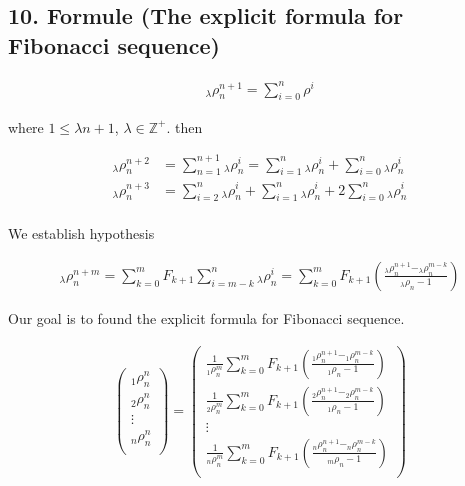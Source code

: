 \subsection{10. Formule (The explicit formula for Fibonacci sequence)}

\begin{align}
      _\lambda \rho_n^{n+1} = \sum_{i=0}^n \rho^i
\end{align}

where \(1 \leq \lambda n+1\), 
\(\lambda \in \mathbb{Z}^+\).
then

\begin{align}
      _\lambda\rho_n^{n+2} &= \sum_{n=1}^{n+1}_\lambda\rho_n^i 
      = \sum_{i=1}^n  _\lambda\rho_n^i + \sum_{i=0}^n _\lambda\rho_n^i \\
      _\lambda\rho_n^{n+3} &= \sum_{i=2}^n_\lambda\rho_n^i + 
      \sum_{i=1}^n_\lambda\rho_n^i + 2\sum_{i=0}^n_\lambda\rho_n^i \\
\end{align}

We establish hypothesis 

\begin{align}
      _\lambda\rho_n^{n+m}= \sum_{k=0}^m F_{k+1}\sum_{i=m-k}^n 
      _\lambda\rho_n^{i}=\sum_{k=0}^m F_{k+1}\left( \frac{_\lambda
      \rho_n^{n+1} - _\lambda\rho_n^{m-k}}{_\lambda\rho_n - 1}\right)
\end{align}

Our goal is to found the explicit formula for Fibonacci sequence.

\begin{align}
      \begin{pmatrix}
            _1\rho_n^n \\
            _2\rho_n^n \\
            \vdots\\
            _n\rho_n^n \\
      \end{pmatrix}
      =
      \begin{pmatrix}
            \frac{1}{_1\rho_n^m}\sum_{k=0}^m 
            F_{k+1}\left( \frac{_1\rho_n^{n+1} -
            _1\rho_n^{m-k}}{_1\rho_n - 1}\right) \\
            \frac{1}{_2\rho_n^m}\sum_{k=0}^m F_{k+1}
            \left( \frac{_2\rho_n^{n+1} - _2\rho_n^{
            m-k}}{_1\rho_n - 1}\right) \\
            \vdots \\
            \frac{1}{_n\rho_n^m}\sum_{k=0}^m F_{k+1}\left(
            \frac{_n\rho_n^{n+1} - _n\rho_n^{m-k}}{_m\rho_n
            - 1}\right) \\
      \end{pmatrix}
\end{align}

